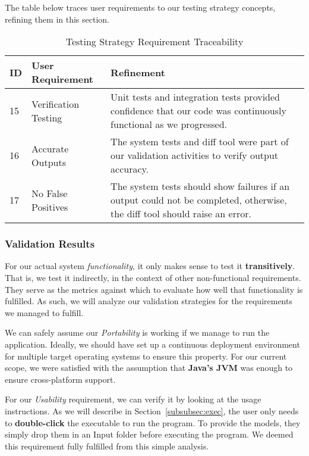 The table below traces user requirements to our testing strategy concepts, refining them in this section.
\begin{table}[htbp]
    \centering
    \caption{Testing Strategy Requirement Traceability}\label{tab:test-strat-table}
    \begin{tabularx}{\textwidth}{| l | l | X |}
        \hline
        \textbf{ID} & \textbf{User Requirement} & \textbf{Refinement} \\
        \hline
        15 & Verification Testing & Unit tests and integration tests provided confidence that our code was continuously functional as we progressed. \\ \hline
        16 & Accurate Outputs & The system tests and diff tool were part of our validation activities to verify output accuracy. \\ \hline
        17 & No False Positives & The system tests should show failures if an output could not be completed, otherwise, the diff tool should raise an error. \\ \hline
    \end{tabularx}
\end{table}
\newpage
\subsubsection{Validation Results}\label{subsubsec:test-validation}
For our actual system \textit{functionality}, it only makes sense to test it \textbf{transitively}.
That is, we test it indirectly, in the context of other non-functional requirements.
They serve as the metrics against which to evaluate how well that functionality is fulfilled.
As such, we will analyze our validation strategies for the requirements we managed to fulfill.

We can safely assume our \textit{Portability} is working if we manage to run the application.
Ideally, we should have set up a continuous deployment environment for multiple target operating systems to ensure this property.
For our current scope, we were satisfied with the assumption that
\textbf{Java's JVM} was enough to ensure cross-platform support.

For our \textit{Usability} requirement, we can verify it by looking at the usage instructions.
As we will describe in Section~\ref{subsubsec:exec}, the user only needs to \textbf{double-click} the executable to run the program.
To provide the models, they simply drop them in an Input folder before executing the program.
We deemed this requirement fully fulfilled from this simple analysis.

